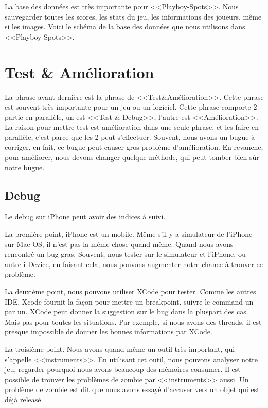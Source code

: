 La base des données est très importante pour <<Playboy-Spots>>. Nous sauvegarder toutes les scores, les stats du jeu, les informations des joueurs, même si les images. 
Voici le schéma de la base des données que nous utilisons dans <<Playboy-Spots>>.





\section{Test \& Amélioration} %
\label{sec:test_&_amélioration}

La phrase avant dernière est la phrase de <<Test\&Amélioration>>. Cette phrase est souvent très importante pour un jeu ou un logiciel. Cette phrase comporte 2 partie en parallèle, un est <<Test \& Debug>>, l'autre est <<Amélioration>>. La raison pour mettre test est amélioration dans une seule phrase, et les faire en parallèle, c'est parce que les 2 peut s’effectuer. Souvent, nous avons un bugue à corriger, en fait, ce bugue peut causer gros problème d'amélioration. En revanche, pour améliorer, nous devons changer quelque méthode, qui peut tomber bien sûr notre bugue.

\subsection{Debug} %
\label{sub:debug}

Le debug sur iPhone peut avoir des indices à suivi. 

La première point, iPhone est un mobile. Même s'il y a simulateur de l'iPhone sur Mac OS, il n'est pas la même chose quand même. Quand nous avons rencontré un bug gras. Souvent, nous tester sur le simulateur et l'iPhone, ou autre i-Device, en faisant cela, nous pouvons augmenter notre chance à trouver ce problème. 

La deuxième point, nous pouvons utiliser XCode pour tester. Comme les autres IDE, Xcode fournit la façon pour mettre un breakpoint, suivre le command un par un. XCode peut donner la suggestion sur le bug dans la pluspart des cas. Mais pas pour toutes les situations. Par exemple, si nous avons des threads, il est presque impossible de donner les bonnes informations par XCode. 

La troisième point. Nous avons quand même un outil très important, qui s'appelle <<instruments>>. En utilisant cet outil, nous pouvons analyser notre jeu, regarder pourquoi nous avons beaucoup des mémoires consumer. Il est possible de trouver les problèmes de zombie par <<instruments>> aussi. Un problème de zombie est dit que nous avons essayé d'accuser vers un objet qui est déjà releasé.

